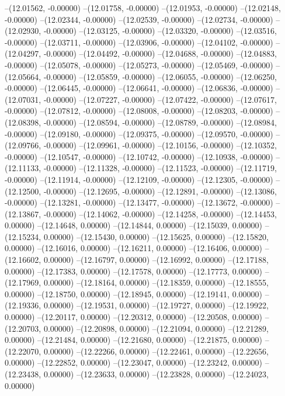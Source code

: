 --(12.01562, -0.00000)
--(12.01758, -0.00000)
--(12.01953, -0.00000)
--(12.02148, -0.00000)
--(12.02344, -0.00000)
--(12.02539, -0.00000)
--(12.02734, -0.00000)
--(12.02930, -0.00000)
--(12.03125, -0.00000)
--(12.03320, -0.00000)
--(12.03516, -0.00000)
--(12.03711, -0.00000)
--(12.03906, -0.00000)
--(12.04102, -0.00000)
--(12.04297, -0.00000)
--(12.04492, -0.00000)
--(12.04688, -0.00000)
--(12.04883, -0.00000)
--(12.05078, -0.00000)
--(12.05273, -0.00000)
--(12.05469, -0.00000)
--(12.05664, -0.00000)
--(12.05859, -0.00000)
--(12.06055, -0.00000)
--(12.06250, -0.00000)
--(12.06445, -0.00000)
--(12.06641, -0.00000)
--(12.06836, -0.00000)
--(12.07031, -0.00000)
--(12.07227, -0.00000)
--(12.07422, -0.00000)
--(12.07617, -0.00000)
--(12.07812, -0.00000)
--(12.08008, -0.00000)
--(12.08203, -0.00000)
--(12.08398, -0.00000)
--(12.08594, -0.00000)
--(12.08789, -0.00000)
--(12.08984, -0.00000)
--(12.09180, -0.00000)
--(12.09375, -0.00000)
--(12.09570, -0.00000)
--(12.09766, -0.00000)
--(12.09961, -0.00000)
--(12.10156, -0.00000)
--(12.10352, -0.00000)
--(12.10547, -0.00000)
--(12.10742, -0.00000)
--(12.10938, -0.00000)
--(12.11133, -0.00000)
--(12.11328, -0.00000)
--(12.11523, -0.00000)
--(12.11719, -0.00000)
--(12.11914, -0.00000)
--(12.12109, -0.00000)
--(12.12305, -0.00000)
--(12.12500, -0.00000)
--(12.12695, -0.00000)
--(12.12891, -0.00000)
--(12.13086, -0.00000)
--(12.13281, -0.00000)
--(12.13477, -0.00000)
--(12.13672, -0.00000)
--(12.13867, -0.00000)
--(12.14062, -0.00000)
--(12.14258, -0.00000)
--(12.14453, 0.00000)
--(12.14648, 0.00000)
--(12.14844, 0.00000)
--(12.15039, 0.00000)
--(12.15234, 0.00000)
--(12.15430, 0.00000)
--(12.15625, 0.00000)
--(12.15820, 0.00000)
--(12.16016, 0.00000)
--(12.16211, 0.00000)
--(12.16406, 0.00000)
--(12.16602, 0.00000)
--(12.16797, 0.00000)
--(12.16992, 0.00000)
--(12.17188, 0.00000)
--(12.17383, 0.00000)
--(12.17578, 0.00000)
--(12.17773, 0.00000)
--(12.17969, 0.00000)
--(12.18164, 0.00000)
--(12.18359, 0.00000)
--(12.18555, 0.00000)
--(12.18750, 0.00000)
--(12.18945, 0.00000)
--(12.19141, 0.00000)
--(12.19336, 0.00000)
--(12.19531, 0.00000)
--(12.19727, 0.00000)
--(12.19922, 0.00000)
--(12.20117, 0.00000)
--(12.20312, 0.00000)
--(12.20508, 0.00000)
--(12.20703, 0.00000)
--(12.20898, 0.00000)
--(12.21094, 0.00000)
--(12.21289, 0.00000)
--(12.21484, 0.00000)
--(12.21680, 0.00000)
--(12.21875, 0.00000)
--(12.22070, 0.00000)
--(12.22266, 0.00000)
--(12.22461, 0.00000)
--(12.22656, 0.00000)
--(12.22852, 0.00000)
--(12.23047, 0.00000)
--(12.23242, 0.00000)
--(12.23438, 0.00000)
--(12.23633, 0.00000)
--(12.23828, 0.00000)
--(12.24023, 0.00000)
